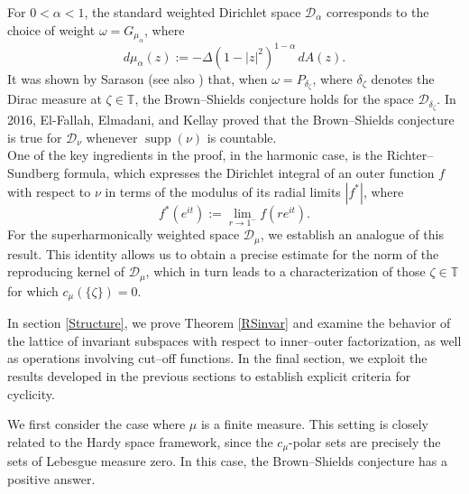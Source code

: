 \documentclass[12pt,reqno,a4paper]{amsart}
\newcommand\TT{\mathbb{T}}
\newcommand{\cD}{{\mathcal{D}}}
\numberwithin{equation}{section}
\begin{document}
\noindent For \(0<\alpha<1\), the standard weighted Dirichlet space \(\cD_{\alpha}\) corresponds to the choice of weight \(\omega = G_{\mu_\alpha}\), where
\[
d\mu_{\alpha}(z) := -\Delta(1-|z|^2)^{1-\alpha}\, dA(z).
\]
%
It was shown by Sarason \cite{Sar} (see also \cite{Gui}) that, when
\(\omega=P_{\delta_{\zeta}}\), where \(\delta_{\zeta}\) denotes the Dirac measure
at \(\zeta\in\mathbb{T}\), the Brown--Shields conjecture holds for the space
\(\mathcal{D}_{\delta_{\zeta}}\). In 2016, El-Fallah, Elmadani, and Kellay
\cite{EEK} proved that the Brown--Shields conjecture is true for
\(\mathcal{D}_{\nu}\) whenever \(\operatorname{supp}(\nu)\) is countable.\\

% 
One of the key ingredients in the proof, in the harmonic case, is the Richter--Sundberg formula, which expresses the Dirichlet integral of an outer function $f$ with respect to $\nu$ in terms of the modulus of its radial limits $|f^*|$, where
\[
f^*(e^{it}) := \lim_{r \to 1^-} f(re^{it}).
\]
For the superharmonically weighted space $\cD_\mu$, we establish an analogue of this result. This identity allows us to obtain a precise estimate for the norm of the reproducing kernel of $\cD_\mu$, which in turn leads to a characterization of those $\zeta \in \TT$ for which $c_{\mu}(\{\zeta\})=0$.

In section \ref{Structure}, we prove Theorem \ref{RSinvar} and examine the behavior of the lattice of invariant subspaces with respect to inner--outer factorization, as well as operations involving cut--off functions. 
In the final section, we exploit the results developed in the previous sections to establish explicit criteria for cyclicity. 

We first consider the case where $\mu$ is a finite measure. This setting is closely related to the Hardy space framework, since the $c_\mu$-polar sets are precisely the sets of Lebesgue measure zero. In this case, the Brown--Shields conjecture has a positive answer.
\end{document}
